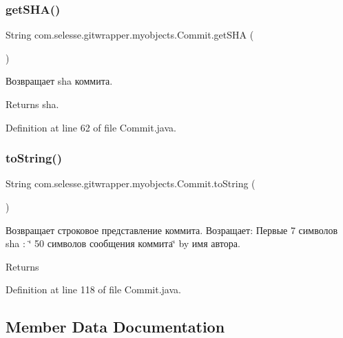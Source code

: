 \subsubsection{\texorpdfstring{get\+S\+H\+A()}{getSHA()}}
{\footnotesize\ttfamily String com.\+selesse.\+gitwrapper.\+myobjects.\+Commit.\+get\+S\+HA (\begin{DoxyParamCaption}{ }\end{DoxyParamCaption})}

Возвращает sha коммита.

\begin{DoxyReturn}{Returns}
sha. 
\end{DoxyReturn}


Definition at line 62 of file Commit.\+java.

\mbox{\label{classcom_1_1selesse_1_1gitwrapper_1_1myobjects_1_1_commit_abc2e5a057294c1d04c0d5329b299ba77}} 
\subsubsection{\texorpdfstring{to\+String()}{toString()}}
{\footnotesize\ttfamily String com.\+selesse.\+gitwrapper.\+myobjects.\+Commit.\+to\+String (\begin{DoxyParamCaption}{ }\end{DoxyParamCaption})}

Возвращает строковое представление коммита. Возращает\+: Первые 7 символов sha \+: \char`\"{} 50 символов сообщения коммита\char`\"{} by имя автора.

\begin{DoxyReturn}{Returns}

\end{DoxyReturn}


Definition at line 118 of file Commit.\+java.



\subsection{Member Data Documentation}
\mbox{\label{classcom_1_1selesse_1_1gitwrapper_1_1myobjects_1_1_commit_ac3bb0d4518fc2b0e7c59190f68639482}} 
